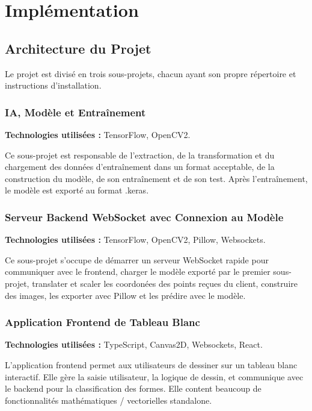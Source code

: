 \documentclass[12pt]{article}
\begin{document}
\section{Implémentation}

\subsection{Architecture du Projet}

Le projet est divisé en trois sous-projets, chacun ayant son propre répertoire et instructions d'installation.

\subsubsection{IA, Modèle et Entraînement}

\textbf{Technologies utilisées :} TensorFlow, OpenCV2.

Ce sous-projet est responsable de l'extraction, de la transformation et du chargement des données d'entraînement dans un format acceptable, de la construction du modèle, de son entraînement et de son test. Après l'entraînement, le modèle est exporté au format .keras.

\subsubsection{Serveur Backend WebSocket avec Connexion au Modèle}

\textbf{Technologies utilisées :} TensorFlow, OpenCV2, Pillow, Websockets.

Ce sous-projet s'occupe de démarrer un serveur WebSocket rapide pour communiquer avec le frontend, charger le modèle exporté par le premier sous-projet, translater et scaler les coordonées des points reçues du client, construire des images, les exporter avec Pillow et les prédire avec le modèle.

\subsubsection{Application Frontend de Tableau Blanc}

\textbf{Technologies utilisées :} TypeScript, Canvas2D, Websockets, React.

L'application frontend permet aux utilisateurs de dessiner sur un tableau blanc interactif. Elle gère la saisie utilisateur, la logique de dessin, et communique avec le backend pour la classification des formes. Elle content beaucoup de fonctionnalités mathématiques / vectorielles standalone.
\end{document}
